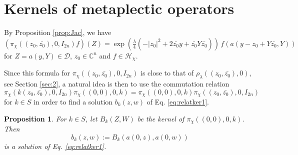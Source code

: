 \documentclass[12pt]{amsart}
\numberwithin{equation}{section}
\newtheorem{proposition}[theorem]{Proposition}
\begin{document}
\section{Kernels of metaplectic operators} \label{sec:6}

By Proposition \ref{prop:Jac}, we have
\begin{equation*}(\pi_{\chi}((z_0,\bar{z_0}),0,I_{2n})f)(Z)=
\exp \left( \tfrac{\lambda}{4}\left(-\vert z_0\vert^2+2\bar{z_0}y+\bar{z_0}Y\bar{z_0}\right)
\right)\,f(a(y-z_0+Y\bar{z_0},Y))
\end{equation*}
for $Z=a(y,Y)\in {\mathcal D}$, $z_0\in {\mathbb C}^n$ and $f\in {\mathcal H}_{\chi}$.

Since this formula for $\pi_{\chi}((z_0,\bar{z_0}),0,I_{2n})$ is close to that of $\rho_{\lambda}
((z_0,\bar{z_0}),0)$, see Section \ref{sec:2}, a natural idea is then to use the commutation relation
\begin{equation*}\pi_{\chi}(k(z_0,\bar{z_0}),0,I_{2n})\pi_{\chi}((0,0),0,k)=\pi_{\chi}((0,0),0,k)\pi_{\chi}((z_0,\bar{z_0}),0,I_{2n})
\end{equation*}
for $k\in S$ in order to find a solution $b_k(z,w)$ of Eq. \ref{eq:relatker1}.

\begin{proposition} \label{prop:relatker2} For $k\in S$, let $B_k(Z,W)$ be the kernel
of $\pi_{\chi}((0,0),0,k)$. Then 
\begin{equation*}b_k(z,w):= B_k(a(0,z),a(0,w))\end{equation*}
 is a solution of Eq. \ref{eq:relatker1}.
\end{proposition}
\end{document}
